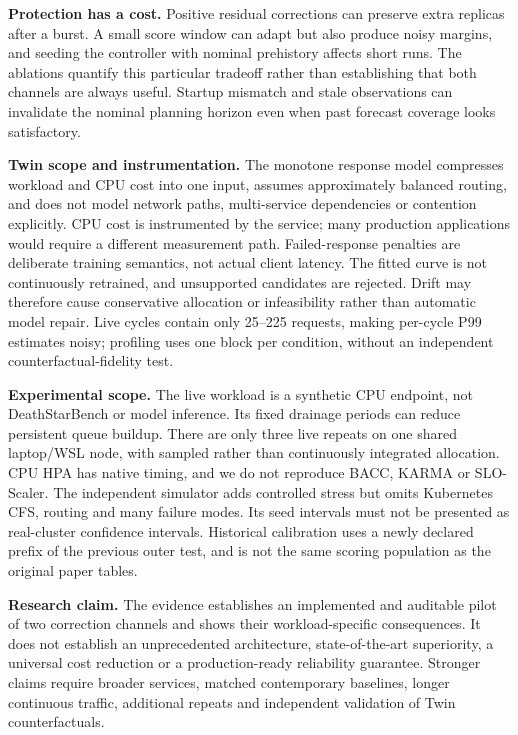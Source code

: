 \documentclass[11pt,a4paper]{article}
\begin{document}
\textbf{Protection has a cost.} Positive residual corrections can preserve extra replicas after a burst. A small score window can adapt but also produce noisy margins, and seeding the controller with nominal prehistory affects short runs. The ablations quantify this particular tradeoff rather than establishing that both channels are always useful. Startup mismatch and stale observations can invalidate the nominal planning horizon even when past forecast coverage looks satisfactory.

\textbf{Twin scope and instrumentation.} The monotone response model compresses workload and CPU cost into one input, assumes approximately balanced routing, and does not model network paths, multi-service dependencies or contention explicitly. CPU cost is instrumented by the service; many production applications would require a different measurement path. Failed-response penalties are deliberate training semantics, not actual client latency. The fitted curve is not continuously retrained, and unsupported candidates are rejected. Drift may therefore cause conservative allocation or infeasibility rather than automatic model repair. Live cycles contain only 25--225 requests, making per-cycle P99 estimates noisy; profiling uses one block per condition, without an independent counterfactual-fidelity test.

\textbf{Experimental scope.} The live workload is a synthetic CPU endpoint, not DeathStarBench or model inference. Its fixed drainage periods can reduce persistent queue buildup. There are only three live repeats on one shared laptop/WSL node, with sampled rather than continuously integrated allocation. CPU HPA has native timing, and we do not reproduce BACC, KARMA or SLO-Scaler. The independent simulator adds controlled stress but omits Kubernetes CFS, routing and many failure modes. Its seed intervals must not be presented as real-cluster confidence intervals. Historical calibration uses a newly declared prefix of the previous outer test, and is not the same scoring population as the original paper tables.

\textbf{Research claim.} The evidence establishes an implemented and auditable pilot of two correction channels and shows their workload-specific consequences. It does not establish an unprecedented architecture, state-of-the-art superiority, a universal cost reduction or a production-ready reliability guarantee. Stronger claims require broader services, matched contemporary baselines, longer continuous traffic, additional repeats and independent validation of Twin counterfactuals.
\end{document}

